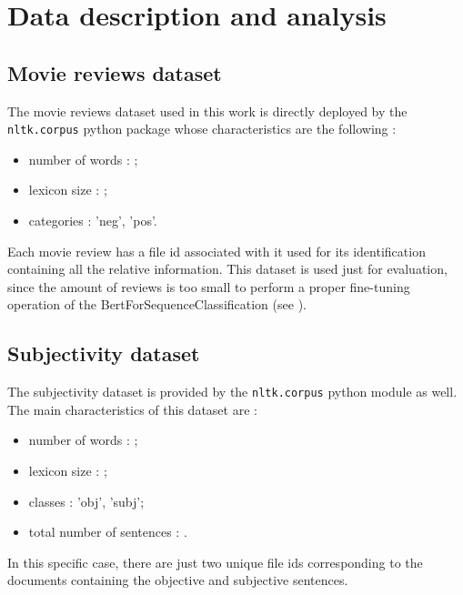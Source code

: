 
\vspace{-0.25cm}
\section{Data description and analysis}
\label{sec:data} 
\subsection{Movie reviews dataset}
\label{subsec:mr}
The movie reviews dataset used in this work is directly deployed by the \texttt{nltk.corpus} python package whose characteristics are the following :
\begin{itemize}
    \item number of words : ;
    \item lexicon size : ;
    \item categories : 'neg', 'pos'.
\end{itemize}
Each movie review has a file id associated with it used for its identification containing all the relative information.
This dataset is used just for evaluation, since the amount of reviews is too small to perform a proper fine-tuning operation of the BertForSequenceClassification (see 
\textbf{}).

\subsection{Subjectivity dataset}
\label{subsec:subj}
The subjectivity dataset is provided by the \texttt{nltk.corpus} python module as well.\\ 
The main characteristics of this dataset are :
\begin{itemize}
    \item number of words : ;
    \item lexicon size : ;
    \item classes : 'obj', 'subj';
    \item total number of sentences : .
\end{itemize}
In this specific case, there are just two unique file ids corresponding to the documents containing the objective and subjective sentences. 


